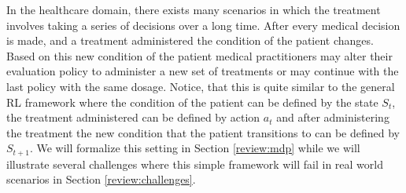 In the healthcare domain, there exists many scenarios in which the treatment involves taking a series of decisions over a long time. After every medical decision is made, and a treatment administered the condition of the patient changes. Based on this new condition of the patient medical practitioners may alter their evaluation policy to administer a new set of treatments or may continue with the last policy with the same dosage. Notice, that this is quite similar to the general RL framework where the condition of the patient can be defined by the state $S_t$, the treatment administered can be defined by action $a_t$ and after administering the treatment the new condition that the patient transitions to can be defined by $S_{t+1}$. We will formalize this setting in Section \ref{review:mdp} while we will illustrate several challenges where this simple framework will fail in real world scenarios in Section \ref{review:challenges}.



